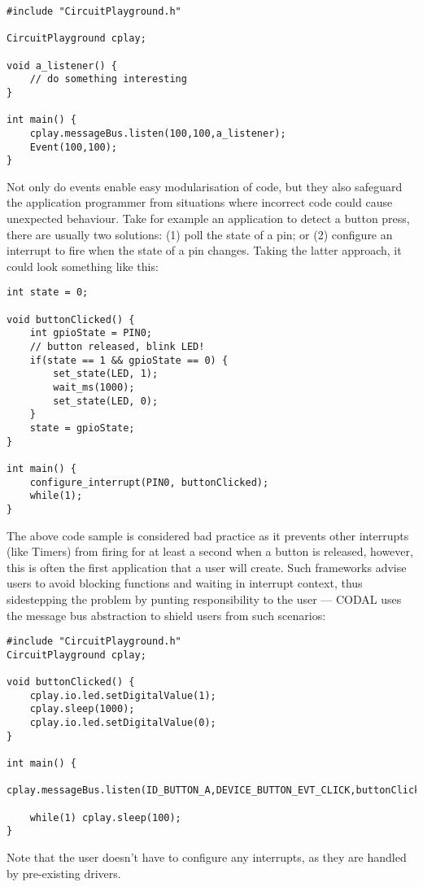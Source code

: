 \begin{lstlisting}
#include "CircuitPlayground.h"

CircuitPlayground cplay;

void a_listener() {
    // do something interesting
}

int main() {
    cplay.messageBus.listen(100,100,a_listener);
    Event(100,100);
}
\end{lstlisting}

Not only do events enable easy modularisation of code, but they also safeguard the application programmer from situations where incorrect code could cause unexpected behaviour. Take for example an application to detect a button press, there are usually two solutions: (1) poll the state of a pin; or (2) configure an interrupt to fire when the state of a pin changes. Taking the latter approach, it could look something like this:

\begin{lstlisting}
int state = 0;

void buttonClicked() {
    int gpioState = PIN0;
    // button released, blink LED!
    if(state == 1 && gpioState == 0) {
        set_state(LED, 1);
        wait_ms(1000);
        set_state(LED, 0);
    }
    state = gpioState;
}

int main() {
    configure_interrupt(PIN0, buttonClicked);
    while(1);
}
\end{lstlisting}

The above code sample is considered bad practice as it prevents other interrupts (like Timers) from firing for at least a second when a button is released, however, this is often the first application that a user will create. Such frameworks advise users to avoid blocking functions and waiting in interrupt context, thus sidestepping the problem by punting responsibility to the user --- CODAL uses the message bus abstraction to shield users from such scenarios:

\begin{lstlisting}
#include "CircuitPlayground.h"
CircuitPlayground cplay;

void buttonClicked() {
    cplay.io.led.setDigitalValue(1);
    cplay.sleep(1000);
    cplay.io.led.setDigitalValue(0);
}

int main() {
    cplay.messageBus.listen(ID_BUTTON_A,DEVICE_BUTTON_EVT_CLICK,buttonClicked);

    while(1) cplay.sleep(100);
}
\end{lstlisting}

Note that the user doesn't have to configure any interrupts, as they are handled by pre-existing drivers.

